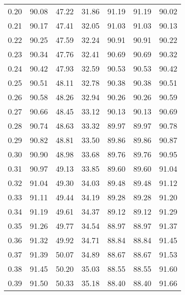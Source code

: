 \begin{tabular}{|c|c|c|c|c|c|c|}
      0.20 &     90.08 &     47.22 &      31.86 &   91.19 &      91.19 &         90.02 \\
      0.21 &     90.17 &     47.41 &      32.05 &   91.03 &      91.03 &         90.13 \\
      0.22 &     90.25 &     47.59 &      32.24 &   90.91 &      90.91 &         90.22 \\
      0.23 &     90.34 &     47.76 &      32.41 &   90.69 &      90.69 &         90.32 \\
      0.24 &     90.42 &     47.93 &      32.59 &   90.53 &      90.53 &         90.42 \\
      0.25 &     90.51 &     48.11 &      32.78 &   90.38 &      90.38 &         90.51 \\
      0.26 &     90.58 &     48.26 &      32.94 &   90.26 &      90.26 &         90.59 \\
      0.27 &     90.66 &     48.45 &      33.12 &   90.13 &      90.13 &         90.69 \\
      0.28 &     90.74 &     48.63 &      33.32 &   89.97 &      89.97 &         90.78 \\
      0.29 &     90.82 &     48.81 &      33.50 &   89.86 &      89.86 &         90.87 \\
      0.30 &     90.90 &     48.98 &      33.68 &   89.76 &      89.76 &         90.95 \\
      0.31 &     90.97 &     49.13 &      33.85 &   89.60 &      89.60 &         91.04 \\
      0.32 &     91.04 &     49.30 &      34.03 &   89.48 &      89.48 &         91.12 \\
      0.33 &     91.11 &     49.44 &      34.19 &   89.28 &      89.28 &         91.20 \\
      0.34 &     91.19 &     49.61 &      34.37 &   89.12 &      89.12 &         91.29 \\
      0.35 &     91.26 &     49.77 &      34.54 &   88.97 &      88.97 &         91.37 \\
      0.36 &     91.32 &     49.92 &      34.71 &   88.84 &      88.84 &         91.45 \\
      0.37 &     91.39 &     50.07 &      34.89 &   88.67 &      88.67 &         91.53 \\
      0.38 &     91.45 &     50.20 &      35.03 &   88.55 &      88.55 &         91.60 \\
      0.39 &     91.50 &     50.33 &      35.18 &   88.40 &      88.40 &         91.66 \\

\end{tabular}
